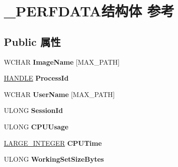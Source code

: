 \hypertarget{struct___p_e_r_f_d_a_t_a}{}\section{\+\_\+\+P\+E\+R\+F\+D\+A\+T\+A结构体 参考}
\label{struct___p_e_r_f_d_a_t_a}
\subsection*{Public 属性}
\begin{DoxyCompactItemize}
\item 
\mbox{\label{struct___p_e_r_f_d_a_t_a_a72004c511843faf6493aedae4f4a4e6d}} 
W\+C\+H\+AR {\bfseries Image\+Name} \mbox{[}M\+A\+X\+\_\+\+P\+A\+TH\mbox{]}
\item 
\mbox{\label{struct___p_e_r_f_d_a_t_a_ace5fcde4f2c28185f58c69d5a84ffeb7}} 
\hyperlink{interfacevoid}{H\+A\+N\+D\+LE} {\bfseries Process\+Id}
\item 
\mbox{\label{struct___p_e_r_f_d_a_t_a_a1dbdcc7fa3bd936f2d3a87a687d1510c}} 
W\+C\+H\+AR {\bfseries User\+Name} \mbox{[}M\+A\+X\+\_\+\+P\+A\+TH\mbox{]}
\item 
\mbox{\label{struct___p_e_r_f_d_a_t_a_a8e5c0dd8ac3900522f7a3999ffd42cb0}} 
U\+L\+O\+NG {\bfseries Session\+Id}
\item 
\mbox{\label{struct___p_e_r_f_d_a_t_a_a4e1a91df1dc9dcaa913b01cc5d849df3}} 
U\+L\+O\+NG {\bfseries C\+P\+U\+Usage}
\item 
\mbox{\label{struct___p_e_r_f_d_a_t_a_a3e965b82185cd4993812ec7296cc63b4}} 
\hyperlink{union___l_a_r_g_e___i_n_t_e_g_e_r}{L\+A\+R\+G\+E\+\_\+\+I\+N\+T\+E\+G\+ER} {\bfseries C\+P\+U\+Time}
\item 
\mbox{\label{struct___p_e_r_f_d_a_t_a_ad7ac8d53824c2531aaf244737a703990}} 
U\+L\+O\+NG {\bfseries Working\+Set\+Size\+Bytes}
\item 
\mbox{\label{struct___p_e_r_f_d_a_t_a_ade42ce0b8a35ed703990c3d9492e6b5c}} 

\end{DoxyCompactItemize}
